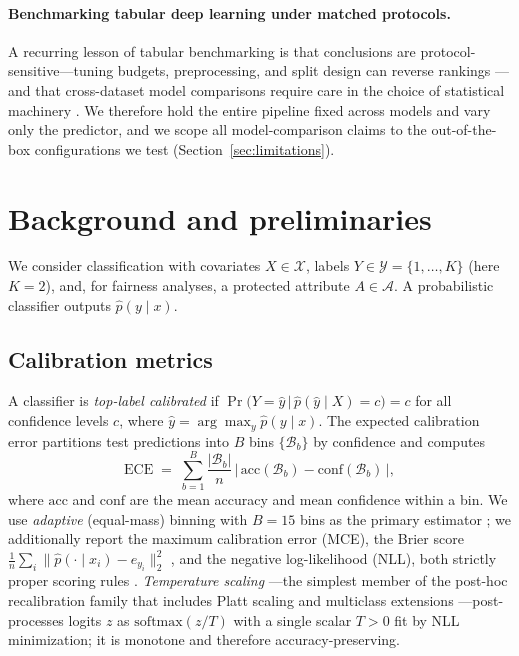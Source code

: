 \documentclass[review,12pt]{elsarticle}
\begin{document}
\paragraph{Benchmarking tabular deep learning under matched protocols.}
A recurring lesson of tabular benchmarking is that conclusions are protocol-sensitive---tuning budgets, preprocessing, and split design can reverse rankings \cite{grinsztajn2022,gorishniy2021,kadra2021}---and that cross-dataset model comparisons require care in the choice of statistical machinery \cite{demsar2006}. We therefore hold the entire pipeline fixed across models and vary only the predictor, and we scope all model-comparison claims to the out-of-the-box configurations we test (Section~\ref{sec:limitations}).

\section{Background and preliminaries}
\label{sec:background}

We consider classification with covariates $X \in \mathcal{X}$, labels $Y \in \mathcal{Y} = \{1,\dots,K\}$ (here $K=2$), and, for fairness analyses, a protected attribute $A \in \mathcal{A}$. A probabilistic classifier outputs $\hat p(y \mid x)$.

\subsection{Calibration metrics}
A classifier is \emph{top-label calibrated} if $\Pr\!\big(Y = \hat y \,\big|\, \hat p(\hat y \mid X) = c\big) = c$ for all confidence levels $c$, where $\hat y = \arg\max_y \hat p(y\mid x)$. The expected calibration error \cite{naeini2015} partitions test predictions into $B$ bins $\{\mathcal{B}_b\}$ by confidence and computes
\begin{equation}
\mathrm{ECE} \;=\; \sum_{b=1}^{B} \frac{|\mathcal{B}_b|}{n} \,\Big|\, \mathrm{acc}(\mathcal{B}_b) - \mathrm{conf}(\mathcal{B}_b) \,\Big| ,
\label{eq:ece}
\end{equation}
where $\mathrm{acc}$ and $\mathrm{conf}$ are the mean accuracy and mean confidence within a bin. We use \emph{adaptive} (equal-mass) binning with $B = 15$ bins as the primary estimator \cite{nixon2019,vaicenavicius2019}; we additionally report the maximum calibration error (MCE), the Brier score $\frac1n\sum_i \|\hat p(\cdot\mid x_i) - e_{y_i}\|_2^2$ \cite{brier1950}, and the negative log-likelihood (NLL), both strictly proper scoring rules \cite{gneiting2007}. \emph{Temperature scaling} \cite{guo2017}---the simplest member of the post-hoc recalibration family that includes Platt scaling and multiclass extensions \cite{platt1999,zadrozny2002,kull2019}---post-processes logits $z$ as $\mathrm{softmax}(z/T)$ with a single scalar $T>0$ fit by NLL minimization; it is monotone and therefore accuracy-preserving.
\end{document}
